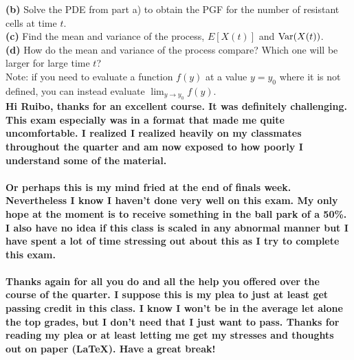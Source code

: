 \documentclass[10pt]{amsart}
\begin{document}
\noindent
{\bf (b)} Solve the PDE from part a) to obtain the PGF for the number of resistant cells at time $t$.
\\

\noindent
{\bf (c)} Find the mean and variance of the process, $E[X(t)]$ and ${\rm Var}(X(t))$.
\\

\noindent
{\bf (d)} How do the mean and variance of the process compare? Which one will be larger for large time $t$?
\\

Note: if you need to evaluate a function $f(y)$ at a value $y=y_0$ where it is not defined, you can instead evaluate $\lim_{y\to y_0} f(y)$. \\

\noindent
\textbf{Hi Ruibo, thanks for an excellent course. It was definitely challenging. This exam especially was in a format that made me quite uncomfortable. I realized I realized heavily on my classmates throughout the quarter and am now exposed to how poorly I understand some of the material. \\ \\ \noindent Or perhaps this is my mind fried at the end of finals week. Nevertheless I know I haven't done very well on this exam. My only hope at the moment is to receive something in the ball park of a 50\%. I also have no idea if this class is scaled in any abnormal manner but I have spent a lot of time stressing out about this as I try to complete this exam. \\ \\ \noindent Thanks again for all you do and all the help you offered over the course of the quarter. I suppose this is my plea to just at least get passing credit in this class. I know I won't be in the average let alone the top grades, but I don't need that I just want to pass. Thanks for reading my plea or at least letting me get my stresses and thoughts out on paper (LaTeX). Have a great break!}
\end{document}
